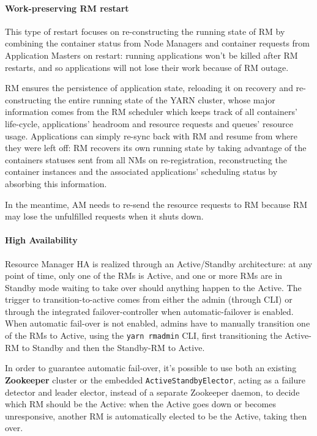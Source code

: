 \paragraph{Work-preserving RM restart} This type of restart focuses on re-constructing the running state of RM by combining the container status from Node Managers and container requests from Application Masters on restart: running applications won't be killed after RM restarts, and so applications will not lose their work because of RM outage. 

RM ensures the persistence of application state, reloading it on recovery and re-constructing the entire running state of the YARN cluster, whose major information comes from the RM scheduler which keeps track of all containers' life-cycle, applications' headroom and resource requests and queues' resource usage. 
Applications can simply re-sync back with RM and resume from where they were left off: RM recovers its own running state by taking advantage of the containers statuses sent from all NMs on re-registration, reconstructing the container instances and the associated applications' scheduling status by absorbing this information. 

In the meantime, AM needs to re-send the resource requests to RM because RM may lose the unfulfilled requests when it shuts down.

\paragraph{High Availability} Resource Manager HA is realized through an Active/Standby architecture: at any point of time, only one of the RMs is Active, and one or more RMs are in Standby mode waiting to take over should anything happen to the Active. The trigger to transition-to-active comes from either the admin (through CLI) or through the integrated failover-controller when automatic-failover is enabled. When automatic fail-over is not enabled, admins have to manually transition one of the RMs to Active, using the \texttt{yarn rmadmin} CLI, first transitioning the Active-RM to Standby and then the Standby-RM to Active.

In order to guarantee automatic fail-over, it's possible to use both an existing \textbf{Zoo\-keeper} cluster or the embedded \texttt{ActiveStandbyElector}, acting as a failure detector and leader elector, instead of a separate Zookeeper daemon, to decide which RM should be the Active: when the Active goes down or becomes unresponsive, another RM is automatically elected to be the Active, taking then over.

